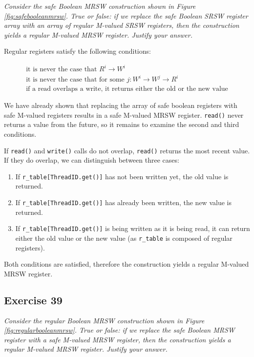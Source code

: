 \documentclass[a4paper,10pt]{article}
\begin{document}
\emph{Consider the safe Boolean MRSW construction shown in Figure \ref{fig:safebooleanmrsw}.
True or false: if we replace the safe Boolean SRSW register array with an array
of regular M-valued SRSW registers, then the construction yields a regular
M-valued MRSW register. Justify your answer.}

\vspace{3mm}

Regular registers satisfy the following conditions:

\begin{gather}
\text{it is never the case that } R^i \rightarrow W^i \\
\text{it is never the case that for some } j: W^i \rightarrow W^j \rightarrow R^i \\
\text{if a read overlaps a write, it returns either the old or the new value}
\end{gather}

We have already shown that replacing the array of safe boolean registers with
safe M-valued registers results in a safe M-valued MRSW register. \lstinline|read()|
never returns a value from the future, so it remains to examine the second and third conditions.

If \lstinline|read()| and \lstinline|write()| calls do not overlap, \lstinline|read()|
returns the most recent value. If they do overlap, we can distinguish between three cases:

\begin{enumerate}
\item If \lstinline|r_table[ThreadID.get()]| has not been written yet, the old value
      is returned.
\item If \lstinline|r_table[ThreadID.get()]| has already been written, the new value
      is returned.
\item If \lstinline|r_table[ThreadID.get()]| is being written as it is being read,
      it can return either the old value or the new value (as \lstinline|r_table|
      is composed of regular registers).
\end{enumerate}

Both conditions are satisfied, therefore the construction yields a regular M-valued MRSW
register.


\subsection{Exercise 39}

\emph{Consider the regular Boolean MRSW construction shown in Figure \ref{fig:regularbooleanmrsw}.
True or false: if we replace the safe Boolean MRSW register with a safe M-valued
MRSW register, then the construction yields a regular M-valued MRSW register.
Justify your answer.}
\end{document}
